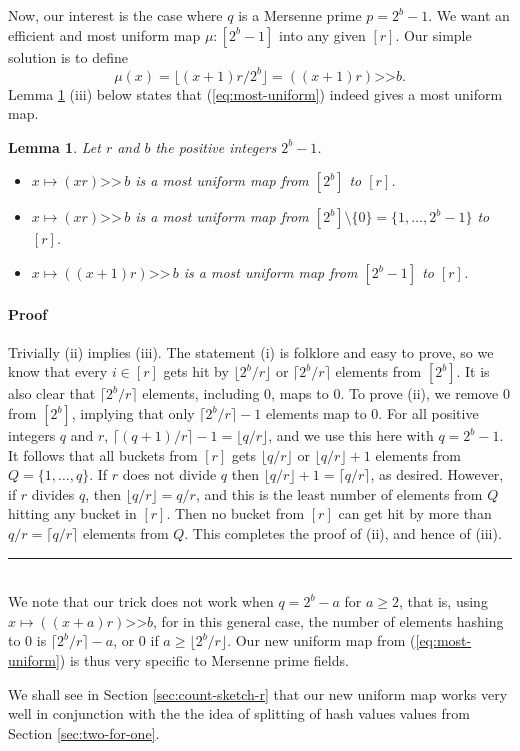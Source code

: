 \documentclass[12pt]{article}
\newcommand{\floor}[1]{\lfloor {#1} \rfloor}
\newcommand{\req}[1]{(\ref{#1})}
\newtheorem {lemma} {Lemma}[section]
\newcommand{\qed}{\rule{1ex}{1ex}}
\newenvironment{proof}[1][]{\paragraph*{Proof{#1}}}{\hfill \qed\smallskip\\}
\newcommand\ceil[1]{\lceil {#1}\rceil}
\begin{document}
Now, our interest is the case where $q$ is a Mersenne prime $p=2^b-1$. We want
an efficient and most uniform map $\mu:[2^b-1]$ into any given $[r]$.
Our simple solution is to define
\begin{equation}\label{eq:most-uniform}
\mu(x)=\floor{(x+1)r/2^b}=((x+1)r)\texttt{>>} b.
\end{equation}
Lemma \ref{lem:most-uniform} (iii) below 
states that \req{eq:most-uniform} indeed
gives a most uniform map. 
\begin{lemma}\label{lem:most-uniform} Let $r$ and $b$ the positive integers
$2^b-1$. 
\begin{itemize}
\item[(i)] $x\mapsto (xr)\texttt{>>}\,b$ is a most
uniform map from $[2^b]$ to $[r]$.
\item[(ii)] $x\mapsto (xr)\texttt{>>}\,b$ is a most
uniform map from $[2^b]\setminus\{0\}=\{1,\ldots,2^b-1\}$ to $[r]$.
\item[(iii)] $x\mapsto ((x+1)r)\texttt{>>}\, b$ is a most
uniform map from $[2^b-1]$ to $[r]$.
\end{itemize}
\end{lemma}
\begin{proof}
Trivially (ii) implies (iii). 
The statement (i) is folklore and easy to prove, so we know that every
$i\in[r]$ gets hit by $\floor {2^b/r}$ or $\ceil{2^b/r}$ elements from
$[2^b]$. It is also clear that $\ceil{2^b/r}$ elements, including $0$,
maps to $0$. To prove (ii), we remove $0$ from $[2^b]$, 
implying that only
$\ceil{2^b/r}-1$ elements map to $0$. For all positive integers $q$
and $r$, $\ceil{(q+1)/r}-1=\floor{q/r}$, and we use this here with 
$q=2^b-1$. It follows that all buckets from $[r]$ gets $\floor{q/r}$
or $\floor{q/r}+1$ elements from $Q=\{1,\ldots,q\}$. If $r$ does
not divide $q$ then $\floor{q/r}+1=\ceil{q/r}$, as desired. However,
if $r$ divides $q$, then $\floor{q/r}=q/r$, and this
is the least number of elements from $Q$ hitting any bucket in $[r]$. Then 
no bucket from $[r]$ can get hit by more than $q/r=\ceil{q/r}$ 
elements from $Q$. This completes the proof of (ii), and hence of (iii).
\end{proof}
We note that our trick does not work when $q=2^b-a$ for $a\geq 2$, that is,
using $x\mapsto ((x+a)r)\texttt{>>} b$, for in this general case, 
the number of elements hashing to $0$ is $\ceil {2^b/r}-a$, or $0$ if
 $a\geq \floor {2^b/r}$. Our new uniform map from \req{eq:most-uniform}
is thus very specific to Mersenne prime fields.

We shall see in Section \ref{sec:count-sketch-r} that our new uniform map
works very well in conjunction with the the idea of splitting of hash values 
values from Section \ref{sec:two-for-one}.
\end{document}
